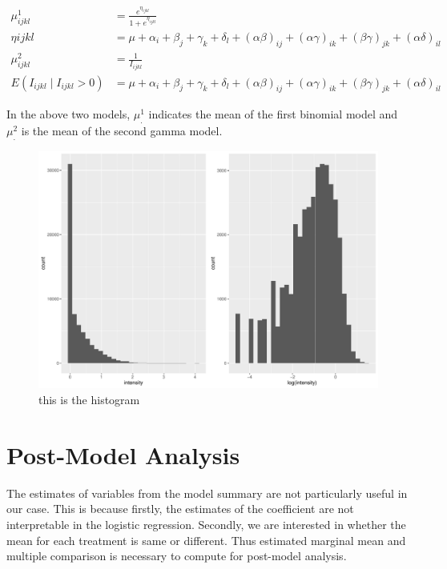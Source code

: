 \documentclass{monashthesis}
\begin{document}
\begin{align}\label{eq:two-part2}
\mu_{ijkl}^1 &= \frac{e^{\eta_{ijkl}}}{1 + e^{\eta_{ijkl}}} \\
\eta{ijkl} &= \mu + \alpha_i + \beta_j +\gamma_k + \delta_l + (\alpha\beta)_{ij} + (\alpha\gamma)_{ik} + (\beta\gamma)_{jk} + (\alpha\delta)_{il} \\
\mu_{ijkl}^2 &= \frac{1}{I_{ijkl}} \\
E(I_{ijkl} \mid I_{ijkl} > 0) &= \mu + \alpha_i + \beta_j +\gamma_k + \delta_l + (\alpha\beta)_{ij} + (\alpha\gamma)_{ik} + (\beta\gamma)_{jk} + (\alpha\delta)_{il}
\end{align}

\noindent In the above two models, \(\mu_{.}^1\) indicates the mean of the first binomial model and \(\mu_{.}^2\) is the mean of the second gamma model.

\begin{figure}

{\centering \includegraphics[width=1\linewidth]{figures/intensity-1} 

}

\caption{this is the histogram}\label{fig:intensity}
\end{figure}

\newpage

\hypertarget{post-model-analysis}{%
\section{Post-Model Analysis}\label{post-model-analysis}}

The estimates of variables from the model summary are not particularly useful in our case. This is because firstly, the estimates of the coefficient are not interpretable in the logistic regression. Secondly, we are interested in whether the mean for each treatment is same or different. Thus estimated marginal mean and multiple comparison is necessary to compute for post-model analysis.
\end{document}
